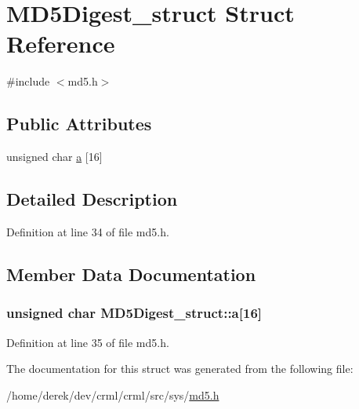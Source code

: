 \hypertarget{struct_m_d5_digest__struct}{
\section{MD5Digest\_\-struct Struct Reference}
\label{struct_m_d5_digest__struct}
}


{\ttfamily \#include $<$md5.h$>$}

\subsection*{Public Attributes}
\begin{DoxyCompactItemize}
\item 
unsigned char \hyperlink{struct_m_d5_digest__struct_a47ba426c0b835e8947717e860464b255}{a} \mbox{[}16\mbox{]}
\end{DoxyCompactItemize}


\subsection{Detailed Description}


Definition at line 34 of file md5.h.



\subsection{Member Data Documentation}
\hypertarget{struct_m_d5_digest__struct_a47ba426c0b835e8947717e860464b255}{
\subsubsection[{a}]{\setlength{\rightskip}{0pt plus 5cm}unsigned char {\bf MD5Digest\_\-struct::a}\mbox{[}16\mbox{]}}}
\label{struct_m_d5_digest__struct_a47ba426c0b835e8947717e860464b255}


Definition at line 35 of file md5.h.



The documentation for this struct was generated from the following file:\begin{DoxyCompactItemize}
\item 
/home/derek/dev/crml/crml/src/sys/\hyperlink{md5_8h}{md5.h}\end{DoxyCompactItemize}
